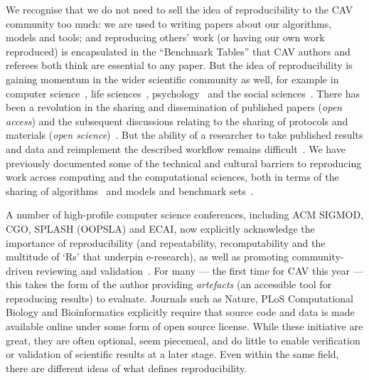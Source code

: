\documentclass{llncs}
\begin{document}
We recognise that we do not need to sell the idea of reproducibility
to the CAV community too much: we are used to writing papers about our
algorithms, models and tools; and reproducing others' work (or having
our own work reproduced) is encapsulated in the ``Benchmark Tables''
that CAV authors and referees both think are essential to any
paper. But the idea of reproducibility is gaining momentum in the
wider scientific community as well, for example in computer
science~\cite{collberg-et-al:2014}, life
sciences~\cite{rollins-et-al:2014},
psychology~\cite{chambers-et-al:2014} and the social
sciences~\cite{conte-et-al:2012}.  There has been a revolution in the
sharing and dissemination of published papers (\emph{open access}) and
the subsequent discussions relating to the sharing of protocols and
materials (\emph{open science})~\cite{rssaaoe:2012}. But the ability
of a researcher to take published results and data and reimplement the
described workflow remains
difficult~\cite{peng:2011,sandve-et-al:2013,wilson-et-al:2014}.  We
have previously documented some of the technical and cultural barriers
to reproducing work across computing and the computational sciences,
both in terms of the sharing of
algorithms~\cite{crick-et-al_wssspe2} and models and benchmark
sets~\cite{crick-et-al_recomp2014,crick+chuehong:2014}.


A number of high-profile computer science conferences, including ACM
SIGMOD, CGO, SPLASH (OOPSLA) and ECAI, now explicitly acknowledge the
importance of reproducibility (and repeatability, recomputability and
the multitude of `Rs' that underpin e-research), as well as promoting
community-driven reviewing and validation~\cite{fursin+dubach:2014}.
For many --- the first time for CAV this year --- this takes the form
of the author providing \emph{artefacts} (an accessible tool for
reproducing results) to evaluate. Journals such as Nature, PLoS
Computational Biology and Bioinformatics explicitly require that
source code and data is made available online under some form of open
source license. While these initiative are great, they are often
optional, seem piecemeal, and do little to enable verification or
validation of scientific results at a later stage. Even within the
same field, there are different ideas of what defines reproducibility.
\end{document}
